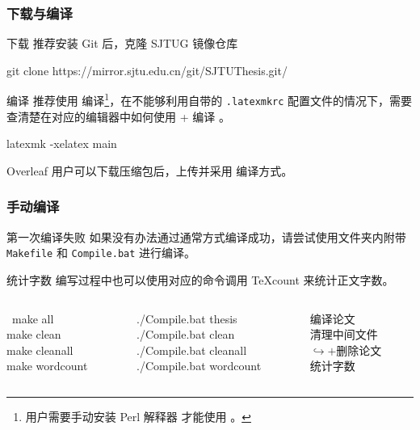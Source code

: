 \begin{frame}
  \frametitle{下载与编译}
  \alert{下载} 推荐安装 Git  后，克隆 SJTUG 镜像仓库
  \begin{exampleblock}{\faGit*}
    \ttfamily\small
    git clone https://mirror.sjtu.edu.cn/git/SJTUThesis.git/
  \end{exampleblock}

  \alert{编译} 推荐使用  编译\footnote{ 用户需要手动安装 Perl 解释器  才能使用 。}，在不能够利用自带的 \texttt{.latexmkrc} 配置文件的情况下，需要查清楚在对应的编辑器中如何使用  +  编译 。
  \begin{exampleblock}{\faTerminal}
    \ttfamily\small
    latexmk -xelatex main
  \end{exampleblock}

  Overleaf 用户可以下载压缩包后，上传并采用  编译方式。
\end{frame}

\begin{frame}
  \frametitle{手动编译}
  \alert{第一次编译失败} 如果没有办法通过通常方式编译成功，请尝试使用文件夹内附带 \faLinux{}\,\faApple{} \texttt{Makefile} 和 \faWindows{} \texttt{Compile.bat} 进行编译。

  \alert{统计字数} 编写过程中也可以使用对应的命令调用 \TeX{}count 来统计正文字数。
  \begin{columns}
    \begin{column}{0.38\textwidth}
      \begin{exampleblock}{\faLinux{}\,\faApple}
        \ttfamily
        make all\\
        make clean\\
        make cleanall\\
        make wordcount
      \end{exampleblock}
    \end{column}
    \begin{column}{0.38\textwidth}
      \begin{exampleblock}{\faWindows}
        \ttfamily
        ./Compile.bat thesis\\
        ./Compile.bat clean\\
        ./Compile.bat cleanall\\
        ./Compile.bat wordcount
      \end{exampleblock}
    \end{column}
    \begin{column}{0.24\textwidth}
      \begin{block}{\faInfo}
        \ttfamily
        编译论文\\
        清理中间文件\\
        $\hookrightarrow +$删除论文\\
        统计字数
      \end{block}
    \end{column}
  \end{columns}
\end{frame}


